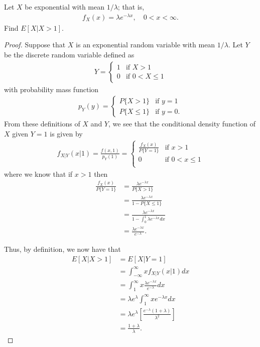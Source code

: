 \begin{problem}{3.13}
  Let $X$ be exponential with mean $1/\lambda$; that is,
  \begin{align*}
    f_{X}(x) = \lambda e^{-\lambda x}, \quad 0 < x < \infty.
  \end{align*}
  Find $E[X|X>1]$.
\end{problem}

\begin{proof}
  Suppose that $X$ is an exponential random variable with mean $1/\lambda$. Let $Y$
  be the discrete random variable defined as
  \begin{align*}
    Y =
    \begin{cases}
      1 & \text{if $X > 1$} \\
      0 & \text{if $0 < X \leq 1$}
    \end{cases}
  \end{align*}
  with probability mass function
  \begin{align*}
    p_Y(y) =
    \begin{cases}
      P\{X > 1\} & \text{if $y = 1$} \\
      P\{X \leq 1\} & \text{if $y = 0$}.
    \end{cases}
  \end{align*}
  From these definitions of $X$ and $Y$, we see that the conditional density function of $X$ given $Y=1$ is
  given by
  \begin{align*}
    f_{X|Y}(x|1) = \frac{f(x, 1)}{p_Y(1)} =
    \begin{cases}
      \frac{f_X(x)}{P\{Y=1\}} & \text{if $x > 1$}\\
      0 & \text{if $0 < x \leq 1$} \\
    \end{cases}
  \end{align*}
  where we know that if $x > 1$ then
  \begin{align*}
    \frac{f_X(x)}{P\{Y=1\}}
    &= \frac{\lambda e^{-\lambda x}}{P\{X > 1\}}\\
    &= \frac{\lambda e^{-\lambda x}}{1 - P\{X \leq 1\}} \\
    &= \frac{\lambda e^{-\lambda x}}{1 - \int_0^1\lambda e^{-\lambda x}dx }\\
    &= \frac{\lambda e^{-\lambda x}}{e^{-\lambda}}.
  \end{align*}

  Thus, by definition, we now have that
  \begin{align*}
    E[X | X > 1] &= E[X | Y = 1] \\
    &= \int_{-\infty}^\infty x f_{X|Y}(x|1) dx \\
    &= \int_{1}^\infty x \frac{\lambda e^{-\lambda x}}{e^{-\lambda}} dx \\
    &= \lambda {e^{\lambda}}\int_{1}^\infty x e^{-\lambda x} dx \\
    &= \lambda {e^{\lambda}}\left[\frac{e^{-\lambda}(1 + \lambda)}{\lambda^2}\right]\\
    &= \frac{1 + \lambda}{\lambda}.
  \end{align*}
\end{proof}
\newpage

